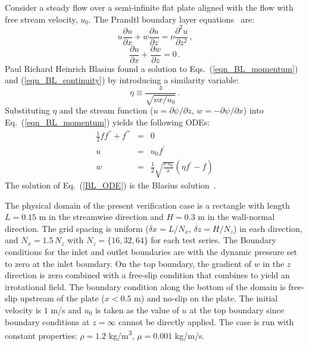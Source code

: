 \documentclass[11pt]{book}
\begin{document}
\noindent Consider a steady flow over a semi-infinite flat plate aligned with the flow with free stream velocity, $u_0$. The Prandtl boundary layer equations~\cite{Panton:1} are:
\begin{equation}
\label{eqn_BL_momentum}
u \frac{\partial u}{\partial x} + w \frac{\partial u}{\partial z} = \nu \frac{\partial^2 u}{\partial z^2} \,\mbox{,}
\end{equation}
\begin{equation}
\label{eqn_BL_continuity}
\frac{\partial u}{\partial x}+\frac{\partial w}{\partial z} = 0 \,\mbox{.}
\end{equation}
Paul Richard Heinrich Blasius found a solution to Eqs.~(\ref{eqn_BL_momentum}) and (\ref{eqn_BL_continuity}) by introducing a similarity variable:
\begin{equation}
\label{eta}
\eta\equiv\frac{z}{\sqrt{\nu x/u_0}} \,\mbox{.}
\end{equation}
Substituting $\eta$ and the stream function ($u = \partial \psi/\partial z$, $w = -\partial \psi/\partial x$) into Eq.~(\ref{eqn_BL_momentum}) yields the following ODEs:
\begin{eqnarray}
\label{BL_ODE}
\frac{1}{2}f f^{''}+f^{'''}&=&0 \\
u&=&u_0 f^{'} \\
w&=&\frac{1}{2}\sqrt{\frac{\nu \,u_0}{x}}(\eta f^{'}-f)
\end{eqnarray}
The solution of Eq.~(\ref{BL_ODE}) is the Blasius solution~\cite{Panton:1}.

The physical domain of the present verification case is a rectangle with length $L=0.15$ m in the streamwise direction and $H=0.3$ m in the wall-normal direction. The grid spacing is uniform ($\delta x = L/N_x$, $\delta z =H/N_z$) in each direction, and $N_x = 1.5 \, N_z$ with $N_z = \{16, 32, 64\}$ for each test series. The Boundary conditions for the inlet and outlet boundaries are  with the dynamic pressure set to zero at the inlet boundary. On the top boundary, the gradient of $w$ in the $z$ direction is zero combined with a free-slip condition that combines to yield an irrotational field. The boundary condition along the bottom of the domain is free-slip upstream of the plate ($x<0.5$ m) and no-slip on the plate. The initial velocity is $1$ m/s and $u_0$ is taken as the value of $u$ at the top boundary since boundary conditions at $z=\infty$ cannot be directly applied. The case is run with constant properties: $\rho=1.2$ \si{kg/m^3}, $\mu = 0.001$ kg/m/s.
\end{document}
